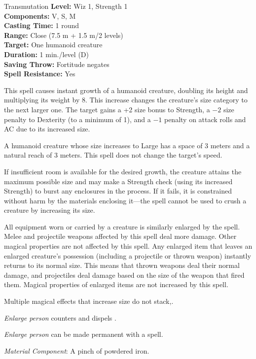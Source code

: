 {Transmutation}
{
	\textbf{Level:}
	Wiz 1, Strength 1\\
	\textbf{Components:}
	V, S, M\\
	\textbf{Casting Time:}
	1 round\\
	\textbf{Range:}
	Close (7.5 m + 1.5 m/2 levels)\\
	\textbf{Target:}
	One humanoid creature\\
	\textbf{Duration:}
	1 min./level (D)\\
	\textbf{Saving Throw:}
	Fortitude negates\\
	\textbf{Spell Resistance:}
	Yes\\
}
{
	This spell causes instant growth of a humanoid creature, doubling its height and multiplying its weight by 8. This increase changes the creature's size category to the next larger one. The target gains a +2 size bonus to Strength, a $-2$ size penalty to Dexterity (to a minimum of 1), and a $-1$ penalty on attack rolls and AC due to its increased size.

	A humanoid creature whose size increases to Large has a space of 3 meters and a natural reach of 3 meters. This spell does not change the target's speed.

	If insufficient room is available for the desired growth, the creature attains the maximum possible size and may make a Strength check (using its increased Strength) to burst any enclosures in the process. If it fails, it is constrained without harm by the materials enclosing it---the spell cannot be used to crush a creature by increasing its size.

	All equipment worn or carried by a creature is similarly enlarged by the spell. Melee and projectile weapons affected by this spell deal more damage. Other magical properties are not affected by this spell. Any enlarged item that leaves an enlarged creature's possession (including a projectile or thrown weapon) instantly returns to its normal size. This means that thrown weapons deal their normal damage, and projectiles deal damage based on the size of the weapon that fired them. Magical properties of enlarged items are not increased by this spell.

	Multiple magical effects that increase size do not stack,.

	\emph{Enlarge person} counters and dispels .

	\emph{Enlarge person} can be made permanent with a  spell.

	\textit{Material Component}:
	A pinch of powdered iron.

}
